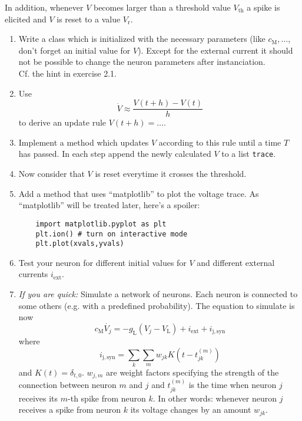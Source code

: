 \documentclass[12pt]{scrartcl}
\newcommand{\ind}[1]{_{\mathrm{#1}}}
\begin{document}
In addition, whenever $V$ becomes larger than a threshold value $V\ind{th}$ a spike is elicited and $V$ is reset to a value $V\ind{r}$.
\begin{enumerate}
\item Write a class which is initialized with the necessary parameters (like $c\ind{M},\dots$, don't forget an initial value for $V$). Except for the external current it should not be possible to change the neuron parameters after instanciation.\\
Cf. the hint in exercise 2.1.
\item Use 
\[ \dot{V}\approx\frac{V(t+h)-V(t)}{h}\]
 to derive an update rule $V(t+h)=\dots$.
\item Implement a method which updates $V$ according to this rule until a time $T$ has passed. In each step append the newly calculated $V$ to a list \texttt{trace}.
\item Now consider that $V$ is reset everytime it crosses the threshold.
\item Add a method that uses ``matplotlib'' to plot the voltage
  trace. As ``matplotlib'' will be treated later, here's a spoiler:
  \begin{lstlisting}
    import matplotlib.pyplot as plt
    plt.ion() # turn on interactive mode
    plt.plot(xvals,yvals)
  \end{lstlisting}
\item Test your neuron for different initial values for $V$ and different
  external currents $i\ind{ext}$.
\item \emph{If you are quick:} Simulate a network of neurons. Each neuron is
  connected to some others (e.g. with a predefined probability). The equation
  to simulate is now 
\[c\ind{M}\dot{V_j}=-g\ind{L}\left(V_j-V\ind{L}\right)+i\ind{ext} + i\ind{j,syn}\]
where 
\[i\ind{j,syn} = \sum\limits_k \sum\limits_{m} w_{jk} K(t-t_{jk}^{(m)})\]
and $K(t)=\delta_{t,0}$. $w_{j,m}$ are weight factors specifying the strength
of the connection between neuron $m$ and $j$ and $t_{jk}^{(m)}$ is the time
when neuron $j$ receives its $m$-th spike from neuron $k$. In other words:
whenever neuron $j$ receives a spike from neuron $k$ its voltage changes by an
amount $w_{jk}$.
  
\end{enumerate}
\end{document}
